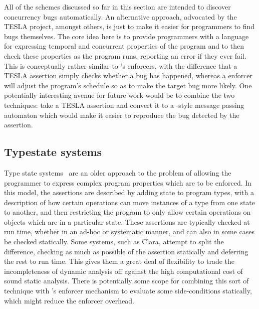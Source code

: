 All of the schemes discussed so far in this section are intended to
discover concurrency bugs automatically.  An alternative approach,
advocated by the TESLA project\needCite{}, amongst others, is just to
make it easier for programmers to find bugs themselves.  The core idea
here is to provide programmers with a language for expressing temporal
and concurrent properties of the program and to then check these
properties as the program runs, reporting an error if they ever fail.
This is conceptually rather similar to {\technique}'s enforcers, with
the difference that a TESLA assertion simply checks whether a bug has
happened, whereas a {\technique} enforcer will adjust the program's
schedule so as to make the target bug more likely.  One potentially
interesting avenue for future work would be to combine the two
techniques: take a TESLA assertion and convert it to a
{\implementation}-style message passing automaton which would make it
easier to reproduce the bug detected by the assertion.

\subsection{Typestate systems}

Type state systems~\cite{Strom1986a} are an older approach to the
problem of allowing the programmer to express complex program
properties which are to be enforced.  In this model, the assertions
are described by adding state to program types, with a description of
how certain operations can move instances of a type from one state to
another, and then restricting the program to only allow certain
operations on objects which are in a particular state.  These
assertions are typically checked at run time\cite{Wolff2011}, whether
in an ad-hoc\cite[pages~305--314]{Gamma1995} or
systematic\cite{Aldrich2009} manner, and can also in some cases be
checked statically\cite{Lam2005}.  Some systems, such as
Clara\cite{Bodden2010}, attempt to split the difference, checking as much as
possible of the assertion statically and deferring the rest to run
time.  This gives them a great deal of flexibility to trade the
incompleteness of dynamic analysis off against the high computational
cost of sound static analysis.  There is potentially some scope for
combining this sort of technique with {\technique}'s enforcer
mechanism to evaluate some side-conditions statically, which might
reduce the enforcer overhead.


